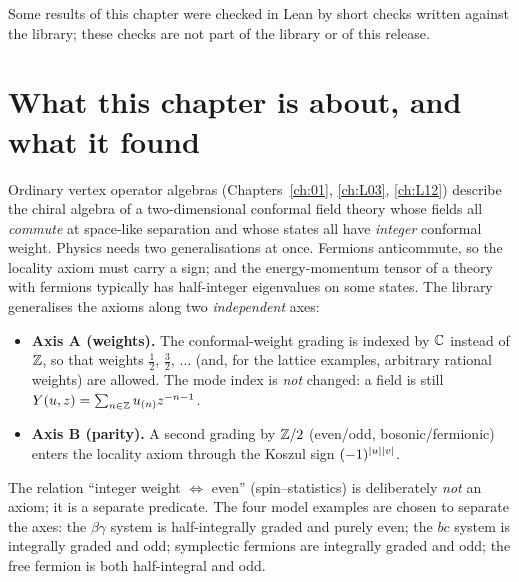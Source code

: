 Some results of this chapter were checked in Lean by short checks written against the library;
these checks are not part of the library or of this release.

\section{What this chapter is about, and what it found}\label{l17:sec:intro}

Ordinary vertex operator algebras (Chapters~\ref{ch:01}, \ref{ch:L03}, \ref{ch:L12}) describe the
chiral algebra of a two-dimensional conformal field theory whose fields all \emph{commute} at
space-like separation and whose states all have \emph{integer} conformal weight. Physics needs two
generalisations at once. Fermions anticommute, so the locality axiom must carry a sign; and the
energy-momentum tensor of a theory with fermions typically has half-integer eigenvalues on some
states. The library generalises the axioms along two \emph{independent} axes:

\begin{itemize}
\item \textbf{Axis A (weights).} The conformal-weight grading is indexed by ${\mathbb{C}}$ instead of ${\mathbb{Z}}$, so
  that weights $\tfrac12$, $\tfrac32$, $\dots$ (and, for the lattice examples, arbitrary rational
  weights) are allowed. The mode index is \emph{not} changed: a field is still
  $Y(u,z)=\sum_{n\in{\mathbb{Z}}}u_{(n)}z^{-n-1}$.
\item \textbf{Axis B (parity).} A second grading by ${\mathbb{Z}}/2$ (even/odd, bosonic/fermionic) enters the
  locality axiom through the Koszul sign $(-1)^{|u||v|}$.
\end{itemize}

The relation ``integer weight $\Leftrightarrow$ even'' (spin--statistics) is deliberately \emph{not}
an axiom; it is a separate predicate. The four model examples are chosen to separate the axes: the
$\beta\gamma$ system is half-integrally graded and purely even; the $bc$ system is integrally graded
and odd; symplectic fermions are integrally graded and odd; the free fermion is both half-integral
and odd.

